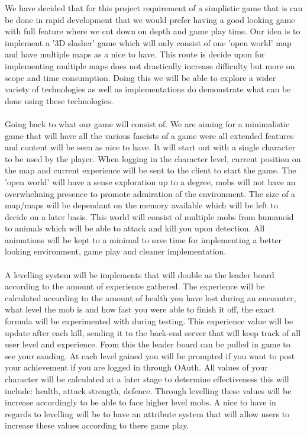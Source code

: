 \documentclass[letterpaper]{article}
\begin{document}
		\vspace{0.2in}
		
			We have decided that for this project requirement of a simplistic game that is can be done in rapid development that we would prefer having a good looking game with full feature where we cut down on depth and game play time. Our idea is to implement a '3D slasher' game which will only consist of one 'open world' map and have multiple maps as a nice to have. This route is decide upon for implementing multiple maps does not drastically increase difficulty but more on scope and time consumption. Doing this we will be able to explore a wider variety of technologies as well as implementations do demonstrate what can be done using these technologies.
			\\
			\\
			Going back to what our game will consist of. We are aiming for a minimalistic game that will have all the various fascists of a game were all extended features and content will be seen as nice to have. It will start out with a single character to be used by the player. When logging in the character level, current position on the map and current experience will be sent to the client to start the game. The 'open world' will have a sense exploration up to a degree, mobs will not have an overwhelming presence to promote admiration of the environment. The size of a map/maps will be dependant on the memory available which will be left to decide on a later basis. This world will consist of multiple mobs from humanoid to animals which will be able to attack and kill you upon detection. All animations will be kept to a minimal to save time for implementing a better looking environment, game play and cleaner implementation.
			\\
			\\
			A levelling system will be implements that will double as the leader board according to the amount of experience gathered. The experience will be calculated according to the amount of health you have lost during an encounter, what level the mob is and how fast you were able to finish it off, the exact formula will be experimented with during testing. This experience value will be update after each kill, sending it to the back-end server that will keep track of all user level and experience. From this the leader board can be pulled in game to see your sanding. At each level gained you will be prompted if you want to post your achievement if you are logged in through OAuth. All values of your character will be calculated at a later stage to determine effectiveness this will include: health, attack strength, defence. Through levelling these values will be increase accordingly to be able to face higher level mobs. A nice to have in regards to levelling will be to have an attribute system that will allow users to increase these values according to there game play.
\end{document}

